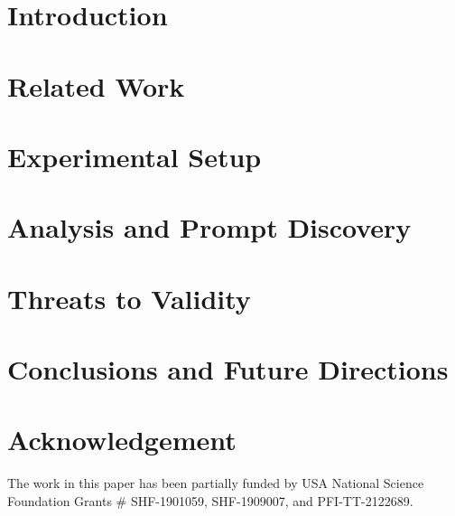 \documentclass[conference]{IEEEtran}
\begin{document}
\section{Introduction}
\label{sec:intro}




\section{Related Work}
\label{sec:related}


\section{Experimental Setup}
\label{sec:design}


%

\section{Analysis and Prompt Discovery}
\label{sec:results}


\section{Threats to Validity}
\label{sec:threats}


\section{Conclusions and Future Directions}
\label{sec:conclusion}




\section*{Acknowledgement}The work in this paper has been partially funded by USA National Science Foundation Grants \# SHF-1901059, SHF-1909007, and PFI-TT-2122689.


\newpage
\balance


\end{document}
